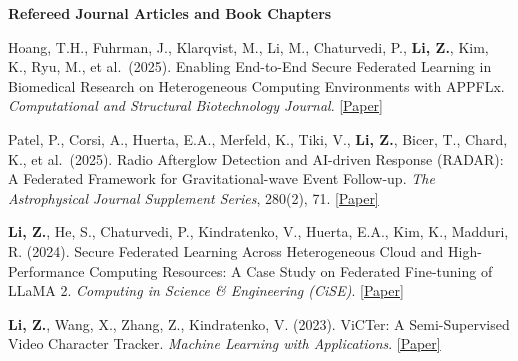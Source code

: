 \documentclass[letterpaper,11pt]{article}
\newcommand{\PubSection}[1]{%
  \vspace{6pt}\noindent\textbf{#1}\vspace{3pt}%
}
\begin{document}
\vspace{-6pt}
\PubSection{Refereed Journal Articles and Book Chapters}
\begin{enumerate}[leftmargin=1cm, label={[\arabic*]}, itemsep=3pt]
  \small
  \item Hoang, T.H., Fuhrman, J., Klarqvist, M., Li, M., Chaturvedi, P., \textbf{Li, Z.}, Kim, K., Ryu, M., et al.\ (2025). Enabling End-to-End Secure Federated Learning in Biomedical Research on Heterogeneous Computing Environments with APPFLx. \textit{Computational and Structural Biotechnology Journal}. \href{https://arxiv.org/abs/2312.08701}{[Paper]}

  \item Patel, P., Corsi, A., Huerta, E.A., Merfeld, K., Tiki, V., \textbf{Li, Z.}, Bicer, T., Chard, K., et al.\ (2025). Radio Afterglow Detection and AI-driven Response (RADAR): A Federated Framework for Gravitational-wave Event Follow-up. \textit{The Astrophysical Journal Supplement Series}, 280(2), 71. \href{https://doi.org/10.3847/1538-4365/adfbea}{[Paper]}

  \item \textbf{Li, Z.}, He, S., Chaturvedi, P., Kindratenko, V., Huerta, E.A., Kim, K., Madduri, R. (2024). Secure Federated Learning Across Heterogeneous Cloud and High-Performance Computing Resources: A Case Study on Federated Fine-tuning of LLaMA 2. \textit{Computing in Science \& Engineering (CiSE)}. \href{https://arxiv.org/abs/2402.12271}{[Paper]}

  \item \textbf{Li, Z.}, Wang, X., Zhang, Z., Kindratenko, V. (2023). ViCTer: A Semi-Supervised Video Character Tracker. \textit{Machine Learning with Applications}. \href{https://doi.org/10.1016/j.mlwa.2023.100460}{[Paper]}
\end{enumerate}
\end{document}
